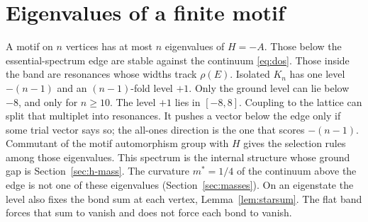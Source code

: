 \section{Eigenvalues of a finite motif}
\label{sec:h-levels}

A motif on \(n\) vertices has at most \(n\) eigenvalues of \(H=-A\).
Those below the essential-spectrum edge are stable against the continuum
\eqref{eq:dos}.
Those inside the band are resonances whose widths track \(\rho(E)\).
Isolated \(K_n\) has one level \(-(n-1)\) and an \((n-1)\)-fold level \(+1\).
Only the ground level can lie below \(-8\), and only for \(n\ge 10\).
The level \(+1\) lies in \([-8,8]\).
Coupling to the lattice can split that multiplet into resonances.
It pushes a vector below the edge only if some trial vector says so;
the all-ones direction is the one that scores \(-(n-1)\).
Commutant of the motif automorphism group with \(H\) gives the selection rules
among those eigenvalues.
This spectrum is the internal structure whose ground gap is
Section~\ref{sec:h-mass}.
The curvature \(m^*=1/4\) of the continuum above the edge is not one of
these eigenvalues (Section~\ref{sec:masses}).
On an eigenstate the level also fixes the bond sum at each vertex,
Lemma~\ref{lem:starsum}.
The flat band forces that sum to vanish and does not force each bond to
vanish.
